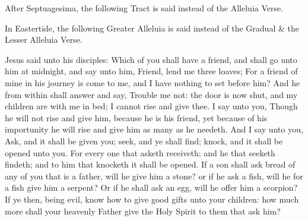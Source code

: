 \begin{rubric}
    After Septuagesima, the following Tract is said instead of the Alleluia Verse.
\end{rubric}


\begin{rubric}
    In Eastertide, the following Greater Alleluia is said instead of the Gradual \& the Lesser Alleluia Verse.
\end{rubric}


 Jesus said unto his disciples: Which of you shall have a friend, and shall go unto him at midnight, and say unto him, Friend, lend me three loaves; For a friend of mine in his journey is come to me, and I have nothing to set before him? And he from within shall answer and say, Trouble me not: the door is now shut, and my children are with me in bed; I cannot rise and give thee. I say unto you, Though he will not rise and give him, because he is his friend, yet because of his importunity he will rise and give him as many as he needeth. And I say unto you, Ask, and it shall be given you; seek, and ye shall find; knock, and it shall be opened unto you. For every one that asketh receiveth; and he that seeketh findeth; and to him that knocketh it shall be opened. If a son shall ask bread of any of you that is a father, will he give him a stone? or if he ask a fish, will he for a fish give him a serpent? Or if he shall ask an egg, will he offer him a scorpion? If ye then, being evil, know how to give good gifts unto your children: how much more shall your heavenly Father give the Holy Spirit to them that ask him?


